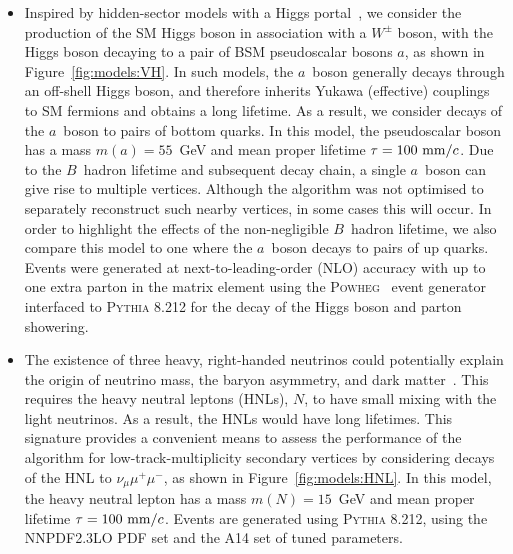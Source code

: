 \documentclass[PUB,UKenglish, texlive=2018]{\ATLASLATEXPATH atlasdoc}
\begin{document}
\begin{itemize}
\item{Inspired by hidden-sector models with a Higgs portal~\cite{Strassler:2006im,Schabinger:2005ei,Patt:2006fw}, we consider the production of the SM Higgs boson in association with a $W^{\pm}$ boson, 
with the Higgs boson decaying to a pair of BSM pseudoscalar bosons $a$, as shown in Figure~\ref{fig:models:VH}.  
In such models, the $a$~boson generally decays through an off-shell Higgs boson, and therefore inherits Yukawa (effective) couplings to SM fermions and obtains a long lifetime.  
As a result, we consider decays of the $a$~boson to pairs of bottom quarks.  In this model, the pseudoscalar boson has a mass $m(a)=55$~GeV and mean proper lifetime $\tau=100~{\rm mm}/c$.
Due to the $B$~hadron lifetime and subsequent decay chain, a single $a$~boson can give rise to multiple vertices.  
Although the algorithm was not optimised to separately reconstruct such nearby vertices, in some cases this will occur.  
In order to highlight the effects of the non-negligible $B$~hadron lifetime, we also compare this model to one where  the $a$~boson decays to pairs of up quarks.
Events were generated at next-to-leading-order (NLO) accuracy with up to one extra parton in the matrix element using the \textsc{Powheg}~\cite{Frixione:2007nw,Nason:2004rx} event generator
interfaced to \textsc{Pythia} 8.212 for the decay of the Higgs boson and parton showering.
}
 
\item{The existence of three heavy, right-handed neutrinos could potentially explain the origin of neutrino mass, the baryon asymmetry, and dark matter~\cite{Asaka:2005pn,Canetti:2012vf}.  This requires the heavy neutral leptons (HNLs), $N$, to have small mixing with the light neutrinos.  As a result, the HNLs would have long lifetimes.  %
This signature provides a convenient means to assess the performance of the algorithm for low-track-multiplicity secondary vertices by considering decays of the HNL to $\nu_{\mu}\mu^{+}\mu^{-}$, as shown in Figure~\ref{fig:models:HNL}.  In this model, the heavy neutral lepton has a mass $m(N)=15$~GeV and mean proper lifetime $\tau=100~{\rm mm}/c$.  
Events are generated using \textsc{Pythia} 8.212, using the NNPDF2.3LO PDF set and the A14 set of tuned parameters.}
\end{itemize}
\end{document}
